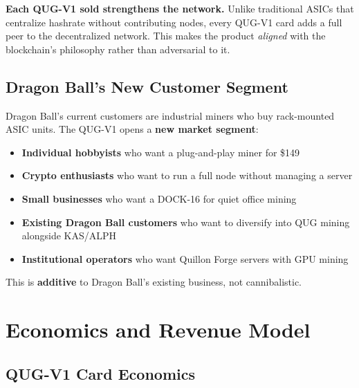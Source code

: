 \documentclass[11pt,a4paper]{article}
\begin{document}
\textbf{Each QUG-V1 sold strengthens the network.} Unlike traditional ASICs that centralize hashrate without contributing nodes, every QUG-V1 card adds a full peer to the decentralized network. This makes the product \textit{aligned} with the blockchain's philosophy rather than adversarial to it.

\subsection{Dragon Ball's New Customer Segment}

Dragon Ball's current customers are industrial miners who buy rack-mounted ASIC units. The QUG-V1 opens a \textbf{new market segment}:

\begin{itemize}[leftmargin=1.5em]
    \item \textbf{Individual hobbyists} who want a plug-and-play miner for \$149
    \item \textbf{Crypto enthusiasts} who want to run a full node without managing a server
    \item \textbf{Small businesses} who want a DOCK-16 for quiet office mining
    \item \textbf{Existing Dragon Ball customers} who want to diversify into QUG mining alongside KAS/ALPH
    \item \textbf{Institutional operators} who want Quillon Forge servers with GPU mining
\end{itemize}

This is \textbf{additive} to Dragon Ball's existing business, not cannibalistic.


\section{Economics and Revenue Model}

\subsection{QUG-V1 Card Economics}
\end{document}
